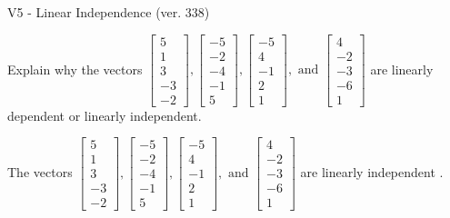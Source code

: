 \begin{exercise}
  \begin{exerciseTitle}V5 - Linear Independence (ver. 338)\end{exerciseTitle}
  \begin{exerciseStatement}
    Explain why the vectors \(\left[\begin{array}{r}
5 \\
1 \\
3 \\
-3 \\
-2
\end{array}\right] , \left[\begin{array}{r}
-5 \\
-2 \\
-4 \\
-1 \\
5
\end{array}\right] , \left[\begin{array}{r}
-5 \\
4 \\
-1 \\
2 \\
1
\end{array}\right] , \text{ and } \left[\begin{array}{r}
4 \\
-2 \\
-3 \\
-6 \\
1
\end{array}\right]\) are linearly dependent or linearly independent.	


  \end{exerciseStatement}
  \begin{exerciseAnswer}
   The vectors \(\left[\begin{array}{r}
5 \\
1 \\
3 \\
-3 \\
-2
\end{array}\right] , \left[\begin{array}{r}
-5 \\
-2 \\
-4 \\
-1 \\
5
\end{array}\right] , \left[\begin{array}{r}
-5 \\
4 \\
-1 \\
2 \\
1
\end{array}\right] , \text{ and } \left[\begin{array}{r}
4 \\
-2 \\
-3 \\
-6 \\
1
\end{array}\right]\) are 
  	 linearly independent  .
  


  \end{exerciseAnswer}
\end{exercise}